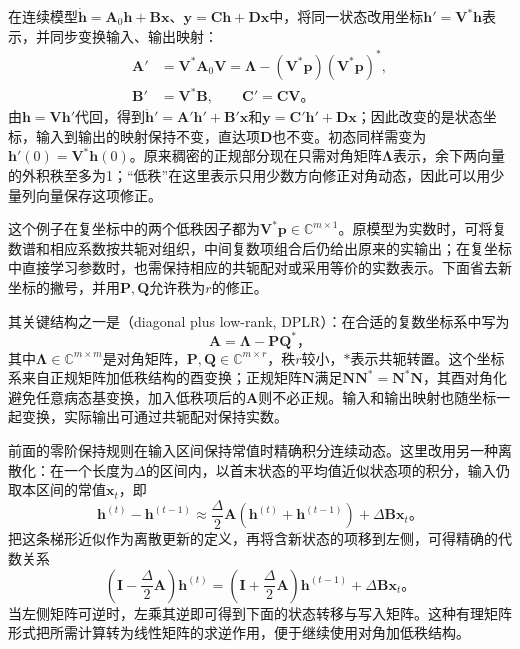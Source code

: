 在连续模型$\dot{\bm h}=\bm A_0\bm h+\bm B\bm x$、$\bm y=\bm C\bm h+\bm D\bm x$中，将同一状态改用坐标$\bm h'=\bm V^*\bm h$表示，并同步变换输入、输出映射：
\[
  \begin{aligned}
    \bm A'&=\bm V^*\bm A_0\bm V
      =\bm\Lambda-(\bm V^*\bm p)(\bm V^*\bm p)^*,\\
    \bm B'&=\bm V^*\bm B,\qquad
    \bm C'=\bm C\bm V\text{。}
  \end{aligned}
\]
由$\bm h=\bm V\bm h'$代回，得到$\dot{\bm h}'=\bm A'\bm h'+\bm B'\bm x$和$\bm y=\bm C'\bm h'+\bm D\bm x$；因此改变的是状态坐标，输入到输出的映射保持不变，直达项$\bm D$也不变。初态同样需变为$\bm h'(0)=\bm V^*\bm h(0)$。原来稠密的正规部分现在只需对角矩阵$\bm\Lambda$表示，余下两向量的外积秩至多为1；“低秩”在这里表示只用少数方向修正对角动态，因此可以用少量列向量保存这项修正。

这个例子在复坐标中的两个低秩因子都为$\bm V^*\bm p\in\mathbb C^{m\times1}$。原模型为实数时，可将复数谱和相应系数按共轭对组织，中间复数项组合后仍给出原来的实输出；在复坐标中直接学习参数时，也需保持相应的共轭配对或采用等价的实数表示。下面省去新坐标的撇号，并用$\bm P,\bm Q$允许秩为$r$的修正。

其关键结构之一是（diagonal plus low-rank, DPLR）：在合适的复数坐标系中写为
\begin{equation}
  \bm{A}=\bm{\Lambda}-\bm{P}\bm{Q}^{*}\text{，}
  \label{eq:rnn-s4-dplr}
\end{equation}
其中$\bm{\Lambda}\in\mathbb{C}^{m\times m}$是对角矩阵，$\bm{P},\bm{Q}\in\mathbb{C}^{m\times r}$，秩$r$较小，$*$表示共轭转置。这个坐标系来自正规矩阵加低秩结构的酉变换；正规矩阵$\bm{N}$满足$\bm{N}\bm{N}^{*}=\bm{N}^{*}\bm{N}$，其酉对角化避免任意病态基变换，加入低秩项后的$\bm{A}$则不必正规。输入和输出映射也随坐标一起变换，实际输出可通过共轭配对保持实数。

前面的零阶保持规则在输入区间保持常值时精确积分连续动态。这里改用另一种离散化：在一个长度为$\Delta$的区间内，以首末状态的平均值近似状态项的积分，输入仍取本区间的常值$\bm x_t$，即
\[
  \bm h^{(t)}-\bm h^{(t-1)}
    \approx\frac{\Delta}{2}\bm A
       \left(\bm h^{(t)}+\bm h^{(t-1)}\right)
       +\Delta\bm B\bm x_t\text{。}
\]
把这条梯形近似作为离散更新的定义，再将含新状态的项移到左侧，可得精确的代数关系
\[
  \left(\bm I-\frac{\Delta}{2}\bm A\right)\bm h^{(t)}
    =\left(\bm I+\frac{\Delta}{2}\bm A\right)\bm h^{(t-1)}
       +\Delta\bm B\bm x_t\text{。}
\]
当左侧矩阵可逆时，左乘其逆即可得到下面的状态转移与写入矩阵。这种有理矩阵形式把所需计算转为线性矩阵的求逆作用，便于继续使用对角加低秩结构。

